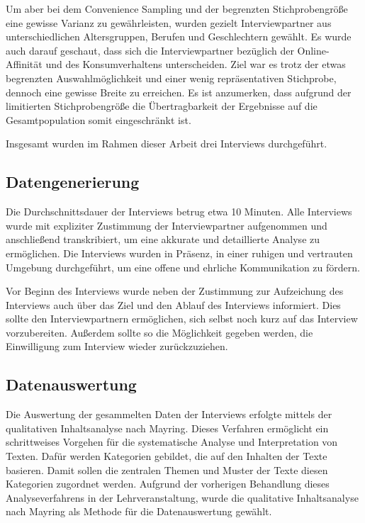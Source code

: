 Um aber bei dem Convenience Sampling und der begrenzten Stichprobengröße eine gewisse Varianz zu gewährleisten, wurden gezielt Interviewpartner aus unterschiedlichen Altersgruppen, Berufen und Geschlechtern gewählt. Es wurde auch darauf geschaut, dass sich die Interviewpartner bezüglich der Online-Affinität und des Konsumverhaltens unterscheiden. Ziel war es trotz der etwas begrenzten Auswahlmöglichkeit und einer wenig repräsentativen Stichprobe, dennoch eine gewisse Breite zu erreichen. Es ist anzumerken, dass aufgrund der limitierten Stichprobengröße die Übertragbarkeit der Ergebnisse auf die Gesamtpopulation somit eingeschränkt ist.

Insgesamt wurden im Rahmen dieser Arbeit drei Interviews durchgeführt.

\subsection{Datengenerierung}
Die Durchschnittsdauer der Interviews betrug etwa 10 Minuten. Alle Interviews wurde mit expliziter Zustimmung der Interviewpartner aufgenommen und anschließend transkribiert, um eine akkurate und detaillierte Analyse zu ermöglichen. Die Interviews wurden in Präsenz, in einer ruhigen und vertrauten Umgebung durchgeführt, um eine offene und ehrliche Kommunikation zu fördern.

Vor Beginn des Interviews wurde neben der Zustimmung zur Aufzeichung des Interviews auch über das Ziel und den Ablauf des Interviews informiert. Dies sollte den Interviewpartnern ermöglichen, sich selbst noch kurz auf das Interview vorzubereiten. Außerdem sollte so die Möglichkeit gegeben werden, die Einwilligung zum Interview wieder zurückzuziehen.

\subsection{Datenauswertung}
Die Auswertung der gesammelten Daten der Interviews erfolgte mittels der qualitativen Inhaltsanalyse nach Mayring. Dieses Verfahren ermöglicht ein schrittweises Vorgehen für die systematische Analyse und Interpretation von Texten. Dafür werden Kategorien gebildet, die auf den Inhalten der Texte basieren. Damit sollen die zentralen Themen und Muster der Texte diesen Kategorien zugordnet werden.
Aufgrund der vorherigen Behandlung dieses Analyseverfahrens in der Lehrveranstaltung, wurde die qualitative Inhaltsanalyse nach Mayring als Methode für die Datenauswertung gewählt.

